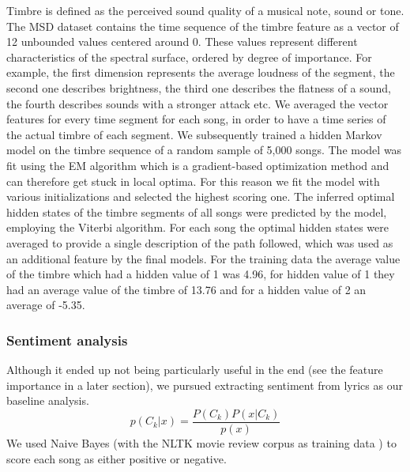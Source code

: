 \documentclass[acmtog]{acmart}
\begin{document}
Timbre is defined as the perceived sound quality of a musical note, sound or tone. The MSD dataset contains the time sequence of the timbre feature as a vector of 12 unbounded values centered around 0. These values represent different characteristics of the spectral
surface, ordered by degree of importance. For example, the first dimension represents the average
loudness of the segment, the second one describes brightness, the third one describes the flatness of a sound, the fourth describes sounds with a stronger attack etc. We averaged the vector features for every time segment for each song, in order to have a time series of the actual timbre of each segment.
We subsequently trained a hidden Markov model on the timbre sequence of a random sample of 5,000 songs. The model was fit using the EM algorithm which is a gradient-based optimization method and can therefore get stuck in local optima. For this reason we fit the model with various initializations and selected the highest scoring one.
The inferred optimal hidden states of the timbre segments of all songs were predicted by the model, employing the Viterbi algorithm.
For each song the optimal hidden states were averaged to provide a single description of the path followed, which was used as an additional feature by the final models.
For the training data the average value of the timbre which had a hidden value of 1 was 4.96, for hidden value of 1 they had an average value of the timbre of 13.76 and for a hidden value of 2 an average of -5.35.

\subsubsection{Sentiment analysis}

Although it ended up not being particularly useful in the end (see the feature importance in a later section), we pursued extracting sentiment from lyrics as our baseline analysis.
\[
  p(C_k | x) = \frac{P(C_k)P(x | C_k)}{p(x)}
\]
We used Naive Bayes (with the NLTK movie review corpus as training data \cite{nltk}) to score each song as either positive or negative.


\end{document}
